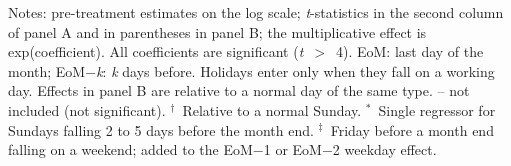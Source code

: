 \documentclass[10pt]{article}
\newcommand{\m}{$-$}
\begin{document}
\vspace{8pt}
\noindent\begin{minipage}{\textwidth}
\footnotesize
Notes: pre-treatment estimates on the log scale; \textit{t}-statistics in the second column of panel A and in parentheses in panel B; the multiplicative effect is exp(coefficient). All coefficients are significant \mbox{(\textbar\textit{t}\textbar~$>$~4)}. EoM: last day of the month; EoM\m\textit{k}: \textit{k} days before. Holidays enter only when they fall on a working day. Effects in panel B are relative to a normal day of the same type. -- not included (not significant).
\mbox{$^{\dagger}$~Relative} to a normal Sunday. \mbox{$^{*}$~Single} regressor for Sundays falling 2 to 5 days before the month end. \mbox{$^{\ddagger}$~Friday} before a month end falling on a weekend; added to the EoM\m1 or EoM\m2 weekday effect.
\end{minipage}
\end{document}
